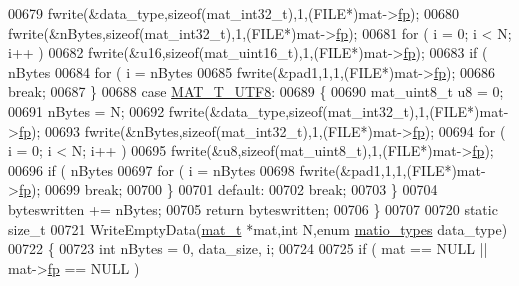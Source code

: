 \begin{DoxyCode}
{{{{00679             fwrite(&data\_type,\textcolor{keyword}{sizeof}(mat\_int32\_t),1,(FILE*)mat->\hyperlink{struct__mat__t_a85f562e407ca9ad4d2a6e14f839432b7}{fp});
00680             fwrite(&nBytes,\textcolor{keyword}{sizeof}(mat\_int32\_t),1,(FILE*)mat->\hyperlink{struct__mat__t_a85f562e407ca9ad4d2a6e14f839432b7}{fp});
00681             \textcolor{keywordflow}{for} ( i = 0; i < N; i++ )
00682                 fwrite(&u16,\textcolor{keyword}{sizeof}(mat\_uint16\_t),1,(FILE*)mat->\hyperlink{struct__mat__t_a85f562e407ca9ad4d2a6e14f839432b7}{fp});
00683             \textcolor{keywordflow}{if} ( nBytes %
00684                 \textcolor{keywordflow}{for} ( i = nBytes %
00685                     fwrite(&pad1,1,1,(FILE*)mat->\hyperlink{struct__mat__t_a85f562e407ca9ad4d2a6e14f839432b7}{fp});
00686             \textcolor{keywordflow}{break};
00687         \}
00688         \textcolor{keywordflow}{case} \hyperlink{group___m_a_t_ggacf7b3b879282b7ab3a51190e49bf3453ac34ad81f5cbd3b7d0d95e57e5be0149b}{MAT\_T\_UTF8}:
00689         \{
00690             mat\_uint8\_t u8 = 0;
00691             nBytes = N;
00692             fwrite(&data\_type,\textcolor{keyword}{sizeof}(mat\_int32\_t),1,(FILE*)mat->\hyperlink{struct__mat__t_a85f562e407ca9ad4d2a6e14f839432b7}{fp});
00693             fwrite(&nBytes,\textcolor{keyword}{sizeof}(mat\_int32\_t),1,(FILE*)mat->\hyperlink{struct__mat__t_a85f562e407ca9ad4d2a6e14f839432b7}{fp});
00694             \textcolor{keywordflow}{for} ( i = 0; i < N; i++ )
00695                 fwrite(&u8,\textcolor{keyword}{sizeof}(mat\_uint8\_t),1,(FILE*)mat->\hyperlink{struct__mat__t_a85f562e407ca9ad4d2a6e14f839432b7}{fp});
00696             \textcolor{keywordflow}{if} ( nBytes %
00697                 \textcolor{keywordflow}{for} ( i = nBytes %
00698                     fwrite(&pad1,1,1,(FILE*)mat->\hyperlink{struct__mat__t_a85f562e407ca9ad4d2a6e14f839432b7}{fp});
00699             \textcolor{keywordflow}{break};
00700         \}
00701         \textcolor{keywordflow}{default}:
00702             \textcolor{keywordflow}{break};
00703     \}
00704     byteswritten += nBytes;
00705     \textcolor{keywordflow}{return} byteswritten;
00706 \}
00707 
00720 \textcolor{keyword}{static} \textcolor{keywordtype}{size\_t}
00721 WriteEmptyData(\hyperlink{struct__mat__t}{mat\_t} *mat,\textcolor{keywordtype}{int} N,\textcolor{keyword}{enum} \hyperlink{group___m_a_t_gacf7b3b879282b7ab3a51190e49bf3453}{matio\_types} data\_type)
00722 \{
00723     \textcolor{keywordtype}{int} nBytes = 0, data\_size, i;
00724 
00725     \textcolor{keywordflow}{if} ( mat == NULL || mat->\hyperlink{struct__mat__t_a85f562e407ca9ad4d2a6e14f839432b7}{fp} == NULL )
}}}}
\end{DoxyCode}
